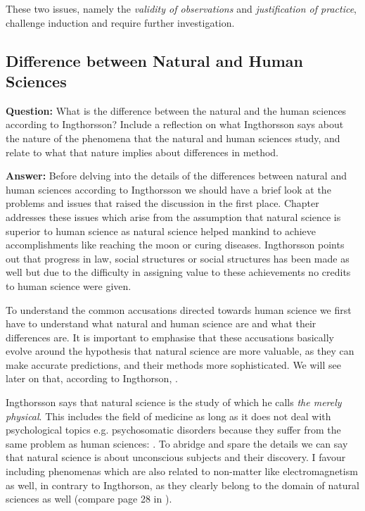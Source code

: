 \documentclass[11pt]{scrartcl}
\begin{document}
These two issues, namely the \textit{validity of observations} and \textit{justification of practice}, challenge induction and require further investigation.

\subsection{Difference between Natural and Human Sciences}

\textbf{Question:} What is the difference between the natural and the human sciences according to Ingthorsson? Include a reflection on what Ingthorsson says about the nature of the phenomena that the natural and human sciences study, and relate to what that nature implies about differences in method.

\bigbreak

\textbf{Answer:} Before delving into the details of the differences between natural and human sciences according to Ingthorsson we should have a brief look at the problems and issues that raised the discussion in the first place. Chapter  \cite[p. 29]{ingtho} addresses these issues which arise from the assumption that natural science is superior to human science as natural science helped mankind to achieve accomplishments like reaching the moon or curing diseases. Ingthorsson points out that progress in law, social structures or social structures has been made as well but due to the difficulty in assigning value to these achievements no credits to human science were given.

To understand the common accusations directed towards human science we first have to understand what natural and human science are and what their differences are. It is important to emphasise that these accusations basically evolve around the hypothesis that natural science are more valuable, as they can make accurate predictions, and their methods more sophisticated. We will see later on that, according to Ingthorson,  \cite[p. 40]{ingtho}.

Ingthorsson says that natural science is the study of  \cite[p. 40]{ingtho} which he calls \textit{the merely physical}. This includes the field of medicine as long as it does not deal with psychological topics e.g. psychosomatic disorders because they suffer from the same problem as human sciences:  \cite[p. 28]{ingtho}. To abridge and spare the details we can say that natural science is about unconscious subjects and their discovery. I favour including phenomenas which are also related to non-matter like electromagnetism as well, in contrary to Ingthorson, as they clearly belong to the domain of natural sciences as well (compare page 28 in \cite{ingtho}).
\end{document}
